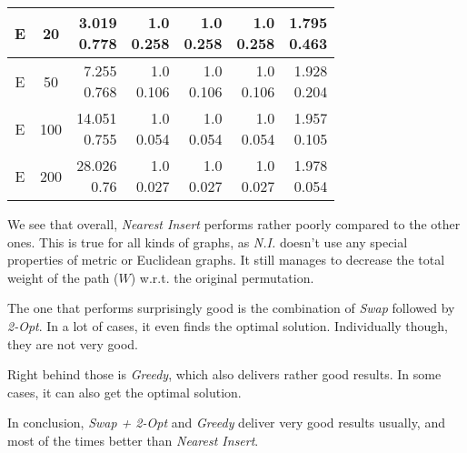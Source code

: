 \documentclass{article}
\newcommand{\ii}[1]{\textit{#1}}
\begin{document}
{\begin{tabular}{|c c|r r r r r|}
  \hline
  E & 20 & \shortstack{ 3.019 \\ 0.778 } & \shortstack{ 1.0 \\ 0.258 } & \shortstack{ 1.0 \\ 0.258 } & \shortstack{ 1.0 \\ 0.258 } & \shortstack{ 1.795 \\ 0.463 } \\ 
  \hline
  E & 50 & \shortstack{ 7.255 \\ 0.768 } & \shortstack{ 1.0 \\ 0.106 } & \shortstack{ 1.0 \\ 0.106 } & \shortstack{ 1.0 \\ 0.106 } & \shortstack{ 1.928 \\ 0.204 } \\ 
  \hline
  E & 100 & \shortstack{ 14.051 \\ 0.755 } & \shortstack{ 1.0 \\ 0.054 } & \shortstack{ 1.0 \\ 0.054 } & \shortstack{ 1.0 \\ 0.054 } & \shortstack{ 1.957 \\ 0.105 } \\ 
  \hline
  E & 200 & \shortstack{ 28.026 \\ 0.76 } & \shortstack{ 1.0 \\ 0.027 } & \shortstack{ 1.0 \\ 0.027 } & \shortstack{ 1.0 \\ 0.027 } & \shortstack{ 1.978 \\ 0.054 } \\ 
  \hline
\end{tabular}}

We see that overall, \ii{Nearest Insert} performs rather poorly compared to the other ones.
This is true for all kinds of graphs, as \ii{N.I.} doesn't use any special properties
of metric or Euclidean graphs. It still manages to decrease the total weight of the path
($W$) w.r.t. the original permutation.

The one that performs surprisingly good is the combination of \ii{Swap} followed by
\ii{2-Opt}. In a lot of cases, it even finds the optimal solution. Individually though,
they are not very good.

Right behind those is \ii{Greedy}, which also delivers rather good results. In some cases,
it can also get the optimal solution.

In conclusion, \ii{Swap + 2-Opt} and \ii{Greedy} deliver very good results usually, and
most of the times better than \ii{Nearest Insert}.
\end{document}
